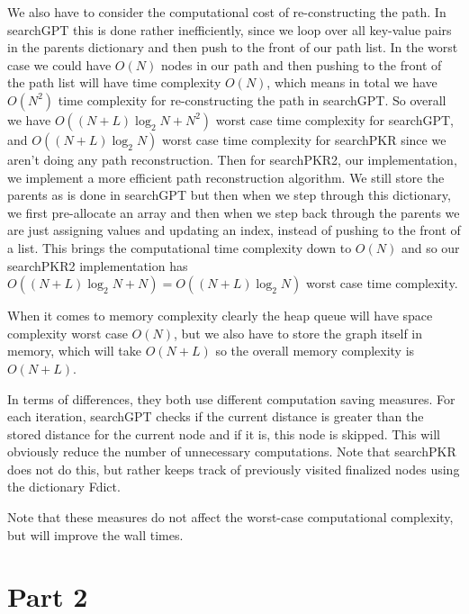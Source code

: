 \documentclass[a4paper, oneside]{book}
\begin{document}
We also have to consider the computational cost of re-constructing the path.
In searchGPT this is done rather inefficiently, since we loop over all key-value pairs
in the parents dictionary and then push to the front of our path list.
In the worst case we could have $O(N)$ nodes in our path and then pushing
to the front of the path list will have time complexity $O(N)$, which means
in total we have $O(N^{2})$ time complexity for re-constructing the path in searchGPT.
So overall we have $O((N + L)\log_{2}N + N^{2})$ worst case time complexity for
searchGPT, and $O((N+L)\log_{2}N)$ worst case time complexity for searchPKR
since we aren't doing any path reconstruction.
Then for searchPKR2, our implementation, we implement a more efficient path
reconstruction algorithm. We still store the parents as is done in searchGPT
but then when we step through this dictionary, we first pre-allocate an array
and then when we step back through the parents we are just assigning values
and updating an index, instead of pushing to the front of a list. This brings
the computational time complexity down to $O(N)$ and so our searchPKR2 implementation
has $O((N+L)\log_{2}N + N) = O((N+L)\log_{2}N)$ worst case time complexity.

When it comes to memory complexity clearly the heap queue will have space complexity
worst case $O(N)$, but we also have to store the graph itself in memory, which will take
$O(N+L)$ so the overall memory complexity is $O(N+L)$.

In terms of differences, they both use different computation saving measures.
For each iteration, searchGPT checks if the current distance is greater than the stored
distance for the current node and if it is, this node is skipped. This will obviously 
reduce the number of unnecessary computations. Note that searchPKR
does not do this, but rather keeps track of previously visited finalized nodes using the
dictionary Fdict.

Note that these measures do not affect the worst-case computational complexity, but
will improve the wall times.

\section*{Part 2}
\end{document}
